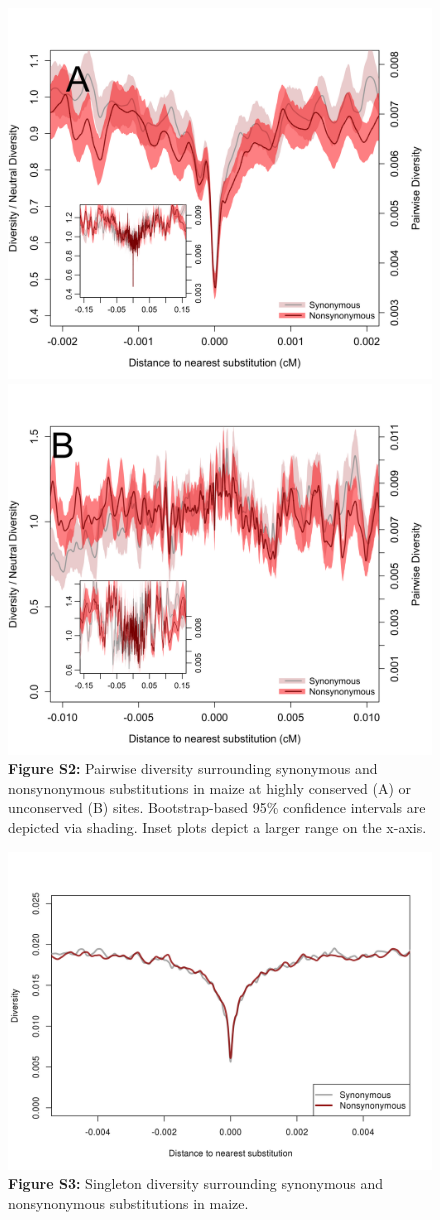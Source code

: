 \documentclass{article}
\begin{document}
\begin{figure}[h!]
  \includegraphics[width=.5\textwidth]{FigsAndFiles/plotDiversity_TvM_Conserved_Significance_June.png}
  \includegraphics[width=.5\textwidth]{FigsAndFiles/plotDiversity_TvM_Unconserved_Significance_June.png}
{\bf Figure S2:} Pairwise diversity surrounding synonymous and nonsynonymous
  substitutions in maize at highly conserved (A) or unconserved (B) sites.  Bootstrap-based 95\% confidence intervals are depicted via shading. Inset plots depict a larger range on the x-axis.
\end{figure}


\begin{figure}[h!]
  \includegraphics[width=\textwidth]{FigsAndFiles/plotDiversity_TvM_Singletons.png}
{\bf Figure S3:} Singleton diversity surrounding synonymous and nonsynonymous
  substitutions in maize.
\end{figure}
\end{document}
